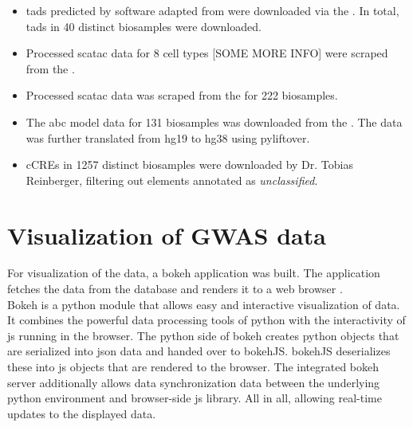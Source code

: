 \begin{itemize}
    \item {} \acp{tad} predicted by software adapted from \textcite{dixonTopologicalDomainsMammalian2012} were downloaded via the . In total, \acp{tad} in 40 distinct biosamples were downloaded.

    \item {} Processed sc\ac{atac} data for 8 cell types [SOME MORE INFO] were scraped from the .

    \item {} Processed \ac{sc}\ac{atac} data was scraped from the  for 222 biosamples.

    \item {} The \ac{abc} model data for 131 biosamples was downloaded from the . The data was further translated from \ac{hg19} to \ac{hg38} using pyliftover.

    \item {} \acp{cCRE} in 1257 distinct biosamples were downloaded by Dr. Tobias Reinberger, filtering out elements annotated as \textit{unclassified}.
\end{itemize}

\section{Visualization of GWAS data}
\label{sec:gwas_vis}
For visualization of the data, a bokeh application was built. The application fetches the data from the database and renders it to a web browser \cite{bokehdevelopmentteamBokehPythonLibrary2022}.\\
Bokeh is a python module that allows easy and interactive visualization of data. It combines the powerful data processing tools of python with the interactivity of \ac{js} running in the browser. The python side of bokeh creates python objects that are serialized into \ac{json} data and handed over to bokehJS. bokehJS deserializes these into \ac{js} objects that are rendered to the browser. The integrated bokeh server additionally allows data synchronization data between the underlying python environment and browser-side \ac{js} library. All in all, allowing real-time updates to the displayed data.

